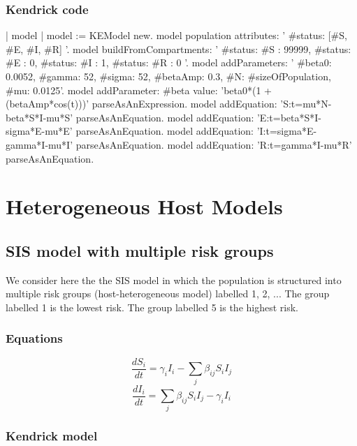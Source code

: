 \documentclass[a4paper,10pt,twoside]{book}
\begin{document}
\subsection{ Kendrick code}

\begin{code}{}
	| model |
	model := KEModel new.
	model population attributes: '{ #status: [#S, #E, #I, #R] }'.
	model
		buildFromCompartments:
			'{
		{ #status: #S }: 99999,
		{ #status: #E }: 0,
		{ #status: #I }: 1,
		{ #status: #R }: 0
	}'.
	model addParameters: '{
		#beta0: 0.0052,
		#gamma: 52,
		#sigma: 52,
		#betaAmp: 0.3,
		#N: #sizeOfPopulation,
		#mu: 0.0125}'.
	model
		addParameter: #beta
		value: 'beta0*(1 + (betaAmp*cos(t)))' parseAsAnExpression.
	model
		addEquation: 'S:t=mu*N-beta*S*I-mu*S' parseAsAnEquation.
	model
		addEquation: 'E:t=beta*S*I-sigma*E-mu*E' parseAsAnEquation.
	model
		addEquation: 'I:t=sigma*E-gamma*I-mu*I' parseAsAnEquation.
	model
		addEquation: 'R:t=gamma*I-mu*R' parseAsAnEquation.
\end{code}

\chapter{ Heterogeneous Host Models}\section{ SIS model with multiple risk groups}
We consider here the the SIS model in which the population is structured into multiple risk groups (host-heterogeneous model) labelled 1, 2, ...
The group labelled 1 is the lowest risk. The group labelled 5 is the highest risk.
\subsection{ Equations}

  \begin{equation}
    \frac{dS_i}{dt} = \gamma_i I_i - \sum_j \beta_{ij} S_i I_j
  \end{equation}
  \begin{equation}
    \frac{dI_i}{dt} = \sum_j \beta_{ij} S_i I_j - \gamma_i I_i
  \end{equation}
  
\subsection{ Kendrick model}
\end{document}
